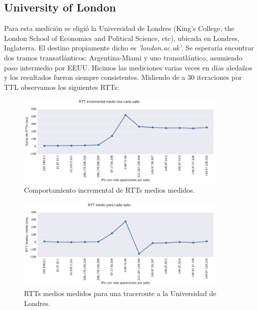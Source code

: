 \subsection{University of London}
\label{sec:london}

Para esta medición se eligió la Universidad de Londres (King's College, the London School of Economics and Political Science, etc), ubicada en Londres, Inglaterra. El destino propiamente dicho es \emph{'london.ac.uk'}. Se esperaría encontrar dos tramos transatlánticos: Argentina-Miami y uno transatlántico, asumiendo paso intermedio por EEUU. Hicimos las mediciones varias veces en días aledaños y los resultados fueron siempre consistentes.  Midiendo de a 30 iteraciones por TTL observamos los siguientes RTTs:
\\

\begin{figure}[H]
    \centering
    \includegraphics[width=0.9\textwidth, height=0.22\textheight, keepaspectratio]{../img/lan-incrementales}
    \caption{Comportamiento incremental de RTTs medios medidos.}
    \label{fig:lan-incrementales}
\end{figure}

\begin{figure}[H]
   \centering
       \includegraphics[width=0.9\textwidth, height=0.22\textheight, keepaspectratio]{../img/lan-rtts}
 \caption{RTTs medios medidos para una traceroute a la Universidad de Londres.}
 \label{fig:lan-rtts}
\end{figure}

